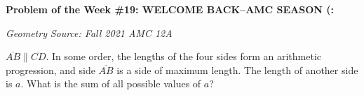 \begin{potw}\vspace{5pt}
{\large\textbf{Problem of the Week \#19: WELCOME BACK--AMC SEASON (:}}\vspace{5pt}

\textit{Geometry}\newline
\textit{Source: Fall 2021 AMC 12A}\V

$\overline{AB} \parallel \overline{CD}$. In some order, the lengths of the four sides form an arithmetic progression, and side $\overline{AB}$ is a side of maximum length. The length of another side is $a$. What is the sum of all possible values of $a$?
\end{potw}\V
